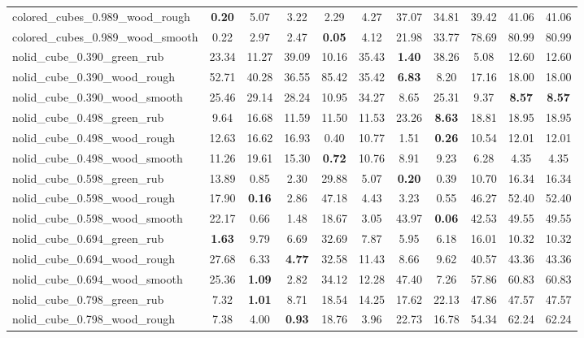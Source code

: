 \begin{table}[H]
{\begin{tabular}{l cccccccccc}
        colored\_cubes\_0.989\_wood\_rough & \textbf{0.20} & 5.07 & 3.22 & 2.29 & 4.27 & 37.07 & 34.81 & 39.42 & 41.06 & 41.06 \\
        colored\_cubes\_0.989\_wood\_smooth & 0.22 & 2.97 & 2.47 & \textbf{0.05} & 4.12 & 21.98 & 33.77 & 78.69 & 80.99 & 80.99 \\
        nolid\_cube\_0.390\_green\_rub & 23.34 & 11.27 & 39.09 & 10.16 & 35.43 & \textbf{1.40} & 38.26 & 5.08 & 12.60 & 12.60 \\
        nolid\_cube\_0.390\_wood\_rough & 52.71 & 40.28 & 36.55 & 85.42 & 35.42 & \textbf{6.83} & 8.20 & 17.16 & 18.00 & 18.00 \\
        nolid\_cube\_0.390\_wood\_smooth & 25.46 & 29.14 & 28.24 & 10.95 & 34.27 & 8.65 & 25.31 & 9.37 & \textbf{8.57} & \textbf{8.57} \\
        nolid\_cube\_0.498\_green\_rub & 9.64 & 16.68 & 11.59 & 11.50 & 11.53 & 23.26 & \textbf{8.63} & 18.81 & 18.95 & 18.95 \\
        nolid\_cube\_0.498\_wood\_rough & 12.63 & 16.62 & 16.93 & 0.40 & 10.77 & 1.51 & \textbf{0.26} & 10.54 & 12.01 & 12.01 \\
        nolid\_cube\_0.498\_wood\_smooth & 11.26 & 19.61 & 15.30 & \textbf{0.72} & 10.76 & 8.91 & 9.23 & 6.28 & 4.35 & 4.35 \\
        nolid\_cube\_0.598\_green\_rub & 13.89 & 0.85 & 2.30 & 29.88 & 5.07 & \textbf{0.20} & 0.39 & 10.70 & 16.34 & 16.34 \\
        nolid\_cube\_0.598\_wood\_rough & 17.90 & \textbf{0.16} & 2.86 & 47.18 & 4.43 & 3.23 & 0.55 & 46.27 & 52.40 & 52.40 \\
        nolid\_cube\_0.598\_wood\_smooth & 22.17 & 0.66 & 1.48 & 18.67 & 3.05 & 43.97 & \textbf{0.06} & 42.53 & 49.55 & 49.55 \\
        nolid\_cube\_0.694\_green\_rub & \textbf{1.63} & 9.79 & 6.69 & 32.69 & 7.87 & 5.95 & 6.18 & 16.01 & 10.32 & 10.32 \\
        nolid\_cube\_0.694\_wood\_rough & 27.68 & 6.33 & \textbf{4.77} & 32.58 & 11.43 & 8.66 & 9.62 & 40.57 & 43.36 & 43.36 \\
        nolid\_cube\_0.694\_wood\_smooth & 25.36 & \textbf{1.09} & 2.82 & 34.12 & 12.28 & 47.40 & 7.26 & 57.86 & 60.83 & 60.83 \\
        nolid\_cube\_0.798\_green\_rub & 7.32 & \textbf{1.01} & 8.71 & 18.54 & 14.25 & 17.62 & 22.13 & 47.86 & 47.57 & 47.57 \\
        nolid\_cube\_0.798\_wood\_rough & 7.38 & 4.00 & \textbf{0.93} & 18.76 & 3.96 & 22.73 & 16.78 & 54.34 & 62.24 & 62.24 \\

\end{tabular}}
\end{table}
